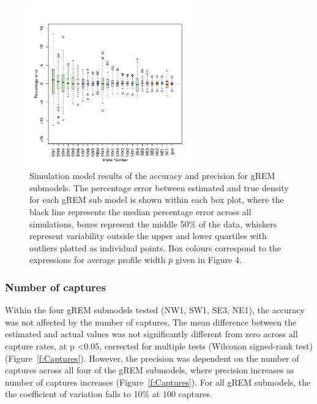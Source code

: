 \documentclass[a4paper,10pt,reqno,oneside]{amsart}
\begin{document}
\begin{figure}[t]
	\centering
	\includegraphics[width=7cm]{imgs/AverageModelBias.pdf}
       	\caption{Simulation model results of the accuracy and precision for gREM submodels. The percentage error between estimated and true density for each gREM sub model is shown within each box plot, where the black line represents the median percentage error across all simulations, boxes represent the middle 50\% of the data, whiskers represent variability outside the upper and lower quartiles with outliers plotted as individual points. Box colours correspond to the expressions for average profile width $\bar{p}$ given in Figure 4.        
} 
	\label{f:ModelBias}
\end{figure}

\subsubsection*{Number of captures}

Within the four gREM submodels tested (NW1, SW1, SE3, NE1), the  accuracy was not affected by the number of captures. The mean difference between the estimated and actual values was not significantly different from zero across all capture rates, at p \textless 0.05, corrected for multiple tests (Wilcoxon signed-rank test) (Figure~\ref{f:Captures}). However, the precision was dependent on the number of captures across all four of the gREM submodels, where precision increases as number of captures increases (Figure~\ref{f:Captures}). For all gREM submodels, the the coefficient of variation falls to 10\% at 100 captures. 
\end{document}

